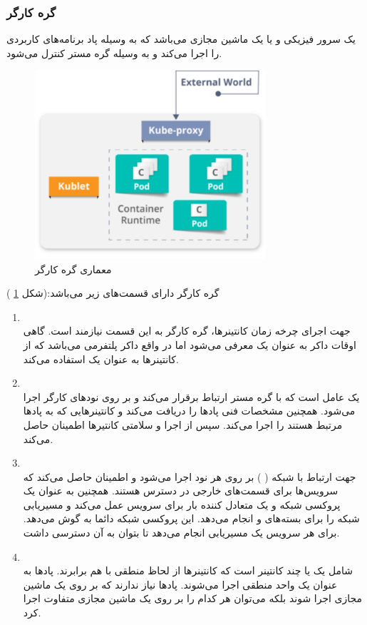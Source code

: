 \subsubsection*{گره کارگر}

یک سرور فیزیکی و یا یک ماشین مجازی می‌باشد که به وسیله پاد برنامه‌های کاربردی را اجرا می‌کند و به وسیله گره مستر کنترل می‌شود. 

\begin{figure}[!h]
	\centering
	\includegraphics[height=7cm]{fig2-12}
	\caption{ معماری گره کارگر}
	\label{تصویر 2-12}
\end{figure}

گره کارگر دارای قسمت‌های زیر می‌باشد:(شکل
\ref{تصویر 2-12}
)
\begin{enumerate}
	\item
	\\
	جهت اجرای چرخه زمان کانتینرها، گره کارگر به این قسمت نیازمند است. گاهی اوقات داکر به عنوان یک
	معرفی می‌شود اما در واقع داکر پلتفرمی می‌باشد که از کانتینرها به عنوان یک
	استفاده می‌کند. 
	
	\item
	\\
	یک عامل است که با گره مستر ارتباط برقرار می‌کند و بر روی نودهای کارگر اجرا می‌شود. همچنین مشخصات فنی پادها را دریافت می‌کند و کانتینرهایی که به پادها مرتبط هستند را اجرا می‌کند. سپس از اجرا و سلامتی کانتیرها اطمینان حاصل می‌کند.
	\item
	\\
	جهت ارتباط با شبکه (
	) بر روی هر نود اجرا می‌شود و اطمینان حاصل می‌کند که سرویس‌ها برای قسمت‌های خارجی در دسترس هستند. همچنین به عنوان یک پروکسی شبکه و یک  متعادل کننده بار برای سرویس عمل می‌کند و مسیریابی شبکه را برای بسته‌های
	و
	انجام می‌دهد. این پروکسی شبکه دائما به
	گوش می‌دهد. برای هر سرویس یک مسیریابی انجام می‌دهد تا بتوان به آن دسترسی داشت.
	\item
	\\
	شامل یک یا چند کانتینر است که کانتینرها از لحاظ منطقی با هم برابرند. پادها به عنوان یک واحد منطقی اجرا می‌شوند. پادها نیاز ندارند که بر روی یک ماشین مجازی اجرا شوند بلکه می‌توان هر کدام را بر روی یک ماشین مجازی متفاوت اجرا کرد. 
\end{enumerate}


